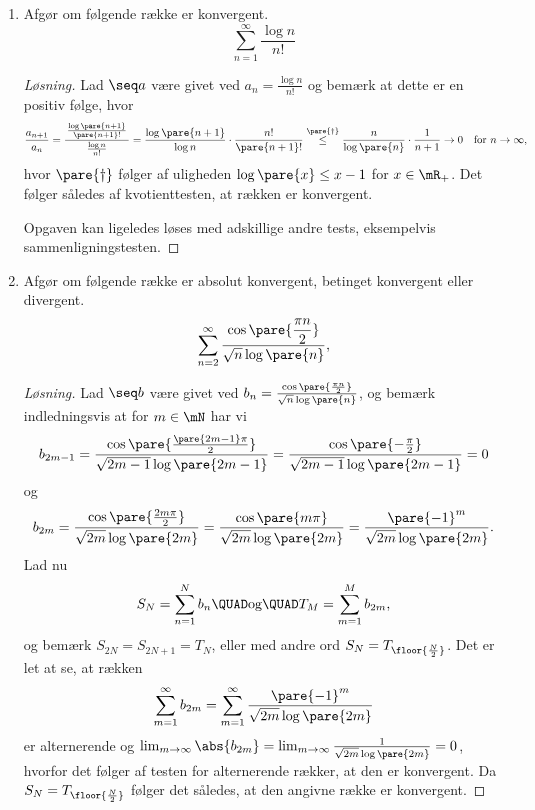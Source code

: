 \begin{opg}\hfill
\begin{enumerate}
    \item Afgør om følgende række er konvergent.
    $$ \sum_{n=1}^\infty \frac{\log n}{n!} $$
    
    \begin{proof}[Løsning]
    Lad $\seq a$ være givet ved $a_n = \frac{\log n}{n!}$ og bemærk at dette er en positiv følge, hvor
    $$ \frac{a_{n+1}}{a_n}
        = \frac{\,\frac{\log\pare{n+1}}{\pare{n+1}!}\,}{\frac{\log n}{n!}}
        = \frac{\log\pare{n+1}}{\log n}\cdot\frac{n!}{\pare{n+1}!}
        \overset{\pare{\dagger}}{\leq} \frac{n}{\log\pare{n}}\cdot\frac{1}{n+1}
        \to 0 \quad\text{for } n\to \infty, $$
    hvor $\pare{\dagger}$ følger af uligheden $\log\pare{x}\leq x-1$ for $x\in\mR_+$. Det følger således af kvotienttesten, at rækken er konvergent.
    
    Opgaven kan ligeledes løses med adskillige andre tests, eksempelvis sammenligningstesten.
    \end{proof}
    
    \item Afgør om følgende række er absolut konvergent, betinget konvergent eller divergent.
    $$ \sum_{n=2}^\infty
        \frac{\cos\pare{\dfrac{\pi n}{2}}}{\sqrt{n}\log\pare{n}},  $$
    \begin{proof}[Løsning]
    Lad $\seq b$ være givet ved $b_n = \frac{\cos\pare{\frac{\pi n}{2}}}{\sqrt{n}\log\pare{n}}$, og bemærk indledningsvis at for $m\in\mN$ har vi
    $$ b_{2m-1} = \frac{\cos\pare{\frac{\pare{2m-1}\pi }{2}}}
                {\sqrt{2m-1}\log\pare{2m-1}}
            = \frac{\cos\pare{-\frac{\pi}{2}}}
                {\sqrt{2m-1}\log\pare{2m-1}} = 0 $$
    og
    $$ b_{2m} = \frac{\cos\pare{\frac{2m\pi }{2}}}
                {\sqrt{2m}\log\pare{2m}}
            = \frac{\cos\pare{m\pi}}{\sqrt{2m}\log\pare{2m}}
            = \frac{\pare{-1}^m}{\sqrt{2m}\log\pare{2m}}. $$
    Lad nu
    $$ S_N = \sum_{n=1}^N b_n \QUAD\text{og}\QUAD  T_M =\sum_{m=1}^M b_{2m}, $$
    og bemærk $S_{2N} = S_{2N+1} = T_N$, eller med andre ord $S_N = T_{\floor{\frac{N}{2}}}$. Det er let at se, at rækken
    $$ \sum_{m=1}^\infty b_{2m}
        = \sum_{m=1}^\infty \frac{\pare{-1}^m}{\sqrt{2m}\log\pare{2m}} $$
    er alternerende og $\lim_{m\to\infty} \abs{b_{2m}} = \lim_{m\to\infty} \frac{1}{\sqrt{2m}\log\pare{2m}} = 0$, hvorfor det følger af testen for alternerende rækker, at den er konvergent. Da $S_N=T_{\floor{\frac{N}{2}}}$ følger det således, at den angivne række er konvergent.
    

\end{proof}
\end{enumerate}
\end{opg}
